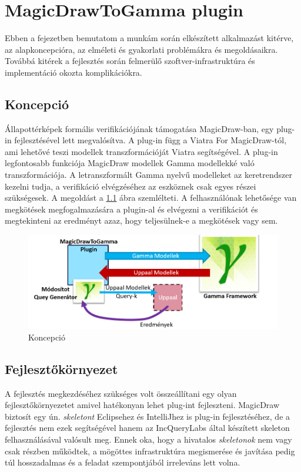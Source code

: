 \chapter{MagicDrawToGamma plugin}\label{chap:contrib}

Ebben a fejezetben bemutatom a munkám során elkészített alkalmazást kitérve, az alapkoncepcióra, az elméleti és gyakorlati problémákra és megoldásaikra. Továbbá kitérek a fejlesztés során felmerülő szoftver-infrastruktúra és implementáció okozta komplikációkra.

\section{Koncepció}
Állapottérképek formális verifikációjának támogatása MagicDraw-ban, egy plug-in fejlesztésével lett megvalósítva. A plug-in függ a Viatra For MagicDraw-tól, ami lehetővé teszi modellek transzformációját Viatra segítségével. A plug-in legfontosabb funkciója MagicDraw modellek Gamma modellekké való transzformációja. A letranszformált Gamma nyelvű modelleket az keretrendszer kezelni tudja, a verifikáció elvégzéséhez az eszköznek csak egyes részei szükségesek. A megoldást a \ref{fig:used-gamma} ábra szemlélteti. A felhasználónak lehetősége van megkötések megfogalmazására a plugin-al és elvégezni a verifikációt és megtekinteni az eredményt azaz, hogy teljesülnek-e a megkötések vagy sem.

\begin{figure}[!ht]
	\centering
	\includegraphics[keepaspectratio, width=150mm]{figures/concept.png}
	\caption{Koncepció}
	\label{fig:used-gamma}
\end{figure}

\section{Fejlesztőkörnyezet}
 A fejlesztés megkezdéséhez szükséges volt összeállítani egy olyan fejlesztőkörnyezetet amivel hatékonyan lehet plug-int fejleszteni. MagicDraw biztosít egy ún. \emph{skeletont} Eclipsehez és IntelliJhez is plug-in fejlesztéséhez, de a fejlesztés nem ezek segítségével hanem az IncQueryLabs által készített skeleton felhasználásával valósult meg. Ennek oka, hogy a hivatalos \emph{skeletonok} nem vagy csak részben működtek, a mögöttes infrastruktúra megismerése és javítása pedig túl hosszadalmas és a feladat szempontjából irreleváns lett volna. 
 
